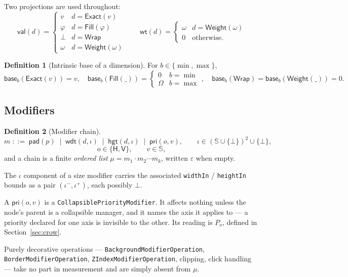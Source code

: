 \documentclass[11pt,a4paper]{article}
\newcommand{\Sc}{\mathbb{S}}
\newcommand{\Om}{\Omega}
\newcommand{\bo}{\bot}
\newcommand{\Exact}{\mathsf{Exact}}
\newcommand{\Fill}{\mathsf{Fill}}
\newcommand{\Wrap}{\mathsf{Wrap}}
\newcommand{\Weight}{\mathsf{Weight}}
\newcommand{\pad}{\mathsf{pad}}
\newcommand{\wdt}{\mathsf{wdt}}
\newcommand{\hgt}{\mathsf{hgt}}
\newcommand{\pri}{\mathsf{pri}}
\newcommand{\Horz}{\mathsf{H}}
\newcommand{\Vrt}{\mathsf{V}}
\newcommand{\base}{\mathsf{base}}
\newcommand{\val}{\mathsf{val}}
\newcommand{\wt}{\mathsf{wt}}
\newcommand{\jv}[1]{\texttt{#1}}       %
\theoremstyle{definition}
\newtheorem{definition}{Definition}[section]
\theoremstyle{plain}
\theoremstyle{remark}
\begin{document}
Two projections are used throughout:
\[
  \val(d) = \begin{cases}
    v & d = \Exact(v) \\
    \varphi & d = \Fill(\varphi) \\
    \bo & d = \Wrap \\
    \omega & d = \Weight(\omega)
  \end{cases}
  \qquad
  \wt(d) = \begin{cases}
    \omega & d = \Weight(\omega) \\
    0 & \text{otherwise.}
  \end{cases}
\]

\begin{definition}[Intrinsic base of a dimension]
For $b \in \{\min, \max\}$,
\[
  \base_b(\Exact(v)) = v, \quad
  \base_b(\Fill(\_)) = \begin{cases} 0 & b = \min \\ \Om & b = \max \end{cases}, \quad
  \base_b(\Wrap) = \base_b(\Weight(\_)) = 0 .
\]
\end{definition}

\subsection{Modifiers}

\begin{definition}[Modifier chain]
\[
  m \;::=\; \pad(p) \;\mid\; \wdt(d, \iota) \;\mid\; \hgt(d, \iota)
        \;\mid\; \pri(o, v),
  \qquad \iota \in (\Sc\cup\{\bo\})^2 \cup \{\bo\},
\]
\[
  o \in \{\Horz, \Vrt\}, \qquad v \in \Sc,
\]
and a chain is a finite \emph{ordered list} $\mu = m_1 \cdot m_2 \cdots m_k$,
written $\varepsilon$ when empty.
\end{definition}

The $\iota$ component of a size modifier carries the associated
\jv{widthIn} / \jv{heightIn} bounds as a pair $(\iota^-, \iota^+)$, each
possibly $\bo$.

A $\pri(o, v)$ is a \jv{CollapsiblePriorityModifier}. It affects nothing unless
the node's parent is a collapsible manager, and it names the axis it applies to
--- a priority declared for one axis is invisible to the other. Its reading is
$P_o$, defined in Section~\ref{sec:crow}.

Purely decorative operations --- \jv{BackgroundModifierOperation},
\jv{BorderModifierOperation}, \jv{ZIndexModifierOperation}, clipping, click
handling --- take no part in measurement and are simply absent from $\mu$.
\end{document}
